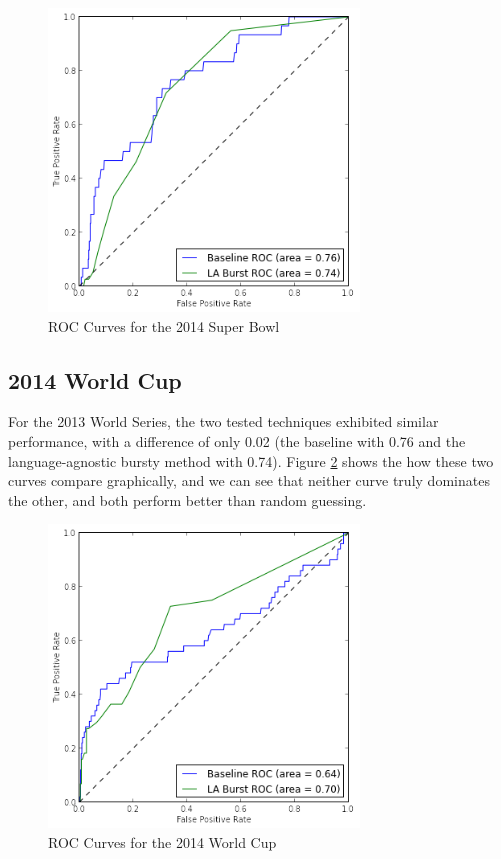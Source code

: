 \documentclass{acm_proc_article-sp}
\begin{document}
\begin{figure}[hbtp]
\begin{center}
\includegraphics[width=3.25in]{./figures/roc_2013_WorldSeries.png}
\caption{ROC Curves for the 2014 Super Bowl}
\label{fig:roc2014SuperBowl}
\end{center}
\end{figure}

\subsection{2014 World Cup}

For the 2013 World Series, the two tested techniques exhibited similar performance, with a difference of only 0.02 (the baseline with 0.76 and the language-agnostic bursty method with 0.74).
Figure \ref{fig:roc2014WorldCup} shows the how these two curves compare graphically, and we can see that neither curve truly dominates the other, and both perform better than random guessing.

\begin{figure}[hbtp]
\begin{center}
\includegraphics[width=3.25in]{./figures/roc_2014_WorldCup.png}
\caption{ROC Curves for the 2014 World Cup}
\label{fig:roc2014WorldCup}
\end{center}
\end{figure}
\end{document}
